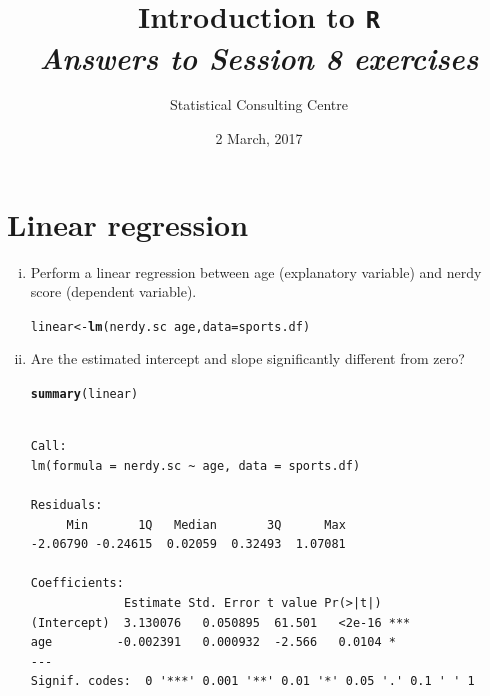 \documentclass[12pt,a4paper]{article}\usepackage[]{graphicx}\usepackage[]{color}
\makeatletter
\newcommand{\hlopt}[1]{\textcolor[rgb]{0,0,0}{#1}}%
\newcommand{\hlstd}[1]{\textcolor[rgb]{0.345,0.345,0.345}{#1}}%
\newcommand{\hlkwb}[1]{\textcolor[rgb]{0.69,0.353,0.396}{#1}}%
\newcommand{\hlkwc}[1]{\textcolor[rgb]{0.333,0.667,0.333}{#1}}%
\newcommand{\hlkwd}[1]{\textcolor[rgb]{0.737,0.353,0.396}{\textbf{#1}}}%
\newenvironment{kframe}{%
 \def\at@end@of@kframe{}%
 \ifinner\ifhmode%
  \def\at@end@of@kframe{\end{minipage}}%
  \begin{minipage}{\columnwidth}%
 \fi\fi%
 \def\FrameCommand##1{\hskip\@totalleftmargin \hskip-\fboxsep
 \colorbox{shadecolor}{##1}\hskip-\fboxsep
     \hskip-\linewidth \hskip-\@totalleftmargin \hskip\columnwidth}%
 \MakeFramed {\advance\hsize-\width
   \@totalleftmargin\z@ \linewidth\hsize
   \@setminipage}}%
 {\par\unskip\endMakeFramed%
 \at@end@of@kframe}
\newenvironment{knitrout}{}{} %
\makeatother
\begin{document}
\setlength\parindent{0cm}
\title{\Large{\textbf{Introduction to \texttt{R}}}\\
\textit{Answers to Session 8 exercises}}
\author{Statistical Consulting Centre}
\date{2 March, 2017}
\maketitle
 
 


\section{Linear regression} 
\label{sec:lm}
\begin{enumerate}[(i)]
\item Perform a linear regression between age (explanatory variable) and nerdy score (dependent variable).
\begin{knitrout}
\color{fgcolor}\begin{kframe}
\begin{alltt}
\hlstd{linear} \hlkwb{<-} \hlkwd{lm}\hlstd{(nerdy.sc}\hlopt{~}\hlstd{age,} \hlkwc{data}\hlstd{=sports.df)}
\end{alltt}
\end{kframe}
\end{knitrout}
\item Are the estimated intercept and slope significantly different from zero?
\begin{knitrout}
\color{fgcolor}\begin{kframe}
\begin{alltt}
\hlkwd{summary}\hlstd{(linear)}
\end{alltt}
\begin{verbatim}

Call:
lm(formula = nerdy.sc ~ age, data = sports.df)

Residuals:
     Min       1Q   Median       3Q      Max 
-2.06790 -0.24615  0.02059  0.32493  1.07081 

Coefficients:
             Estimate Std. Error t value Pr(>|t|)    
(Intercept)  3.130076   0.050895  61.501   <2e-16 ***
age         -0.002391   0.000932  -2.566   0.0104 *  
---
Signif. codes:  0 '***' 0.001 '**' 0.01 '*' 0.05 '.' 0.1 ' ' 1


\end{verbatim}
\end{kframe}
\end{knitrout}
\end{enumerate}
\end{document}
